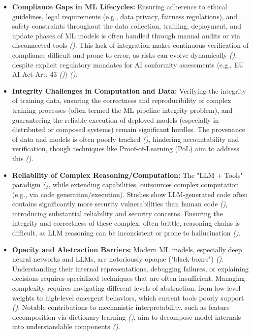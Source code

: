 \documentclass[12pt,a4paper]{report}
\renewcommand{\citep}[1]{\textit{\scriptsize{(\cite{#1})}}}
\begin{document}
	\begin{itemize}[leftmargin=*]
		\item \textbf{Compliance Gaps in ML Lifecycles:} Ensuring adherence to ethical guidelines, legal requirements (e.g., data privacy, fairness regulations), and safety constraints throughout the data collection, training, deployment, and update phases of ML models is often handled through manual audits or via disconnected tools \citep{Bhardwaj2024AIGovMLOps}. This lack of integration makes continuous verification of compliance difficult and prone to error, as risks can evolve dynamically \citep{AdditionalCitationRef12}, despite explicit regulatory mandates for AI conformity assessments (e.g., EU AI Act Art. 43 \citep{EUAIAct2024}) \citep{Navigating_AI_Conformity_2025, AgenticLandscape_Ref26}.
		\item \textbf{Integrity Challenges in Computation and Data:} Verifying the integrity of training data, ensuring the correctness and reproducibility of complex training processes (often termed the ML pipeline integrity problem), and guaranteeing the reliable execution of deployed models (especially in distributed or composed systems) remain significant hurdles. The provenance of data and models is often poorly tracked \citep{AgenticLandscape_Ref25}, hindering accountability and verification, though techniques like Proof-of-Learning (PoL) aim to address this \citep{Jia2021ProofOfLearning}.
		\item \textbf{Reliability of Complex Reasoning/Computation:} The "LLM + Tools" paradigm \citep{AgenticLandscape_Ref49}, while extending capabilities, outsources complex computation (e.g., via code generation/execution). Studies show LLM-generated code often contains significantly more security vulnerabilities than human code \citep{AdditionalCitationRef14}, introducing substantial reliability and security concerns. Ensuring the integrity and correctness of these complex, often brittle, reasoning chains is difficult, as LLM reasoning can be inconsistent or prone to hallucination \citep{AgenticLandscape_Ref86}.
		\item \textbf{Opacity and Abstraction Barriers:} Modern ML models, especially deep neural networks and LLMs, are notoriously opaque ("black boxes") \citep{AdditionalCitationRef42}. Understanding their internal representations, debugging failures, or explaining decisions requires specialized techniques that are often insufficient. Managing complexity requires navigating different levels of abstraction, from low-level weights to high-level emergent behaviors, which current tools poorly support \citep{AgenticLandscape_Ref25}. Notable contributions to mechanistic interpretability, such as feature decomposition via dictionary learning \citep{AdditionalCitationRef15}, aim to decompose model internals into understandable components \citep{Anthropic_Decompose_2023}.

\end{itemize}
\end{document}

